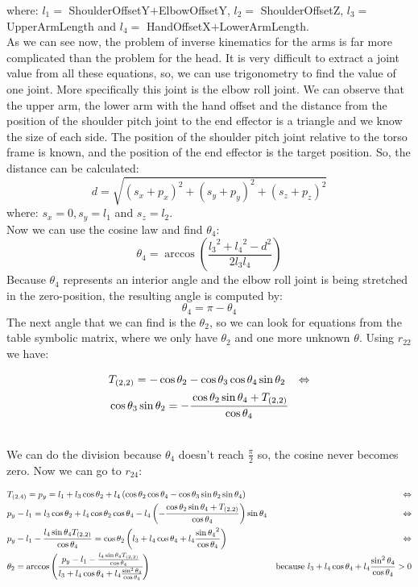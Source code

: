 where: $l_1 =$ ShoulderOffsetY$+$ElbowOffsetY, $l_2 =$ ShoulderOffsetZ, $l_3 =$ UpperArmLength and $l_4 =$ HandOffsetX$+$LowerArmLength.\\
As we can see now, the problem of inverse kinematics for the arms is far more complicated than the problem for the head. It is very difficult to extract a joint value from all these equations, so, we can use trigonometry to find the value of one joint. More specifically this joint is the elbow roll joint. We can observe that the upper arm, the lower arm with the hand offset and the distance from the position of the shoulder pitch joint to the end effector is a triangle and we know the size of each side. The position of the shoulder pitch joint relative to the torso frame is known, and the position of the end effector is the target position. So, the distance can be calculated:
\[
d=\sqrt{\left(s_x+p_x\right)^2 + \left(s_y+p_y\right)^2 + \left(s_z+p_z\right)^2}
\]
where: \(s_x = 0, s_y = l_1\) and \(s_z = l_2\).\\
Now we can use the cosine law and find \(\theta_4\):
\[
\theta_4 = \arccos\left(\frac{{l_3}^2 + {l_4}^2 - d^2}{2l_3l_4}\right)
\]
Because \(\theta_4\) represents an interior angle and the elbow roll joint is being stretched in the zero-position, the resulting angle is computed by:
\[
\theta_4 = \pi - \theta_4
\]
The next angle that we can find is the \(\theta_2\), so we can look for equations from the table symbolic matrix, where we only have \(\theta_2\) and one more unknown \(\theta\). Using $r_{22}$ we have:
\begin{small}
\begin{align*}
&T_{(2,2)} = -\cos\theta_2 - \cos\theta_3\cos\theta_4\sin\theta_2 &\Leftrightarrow\\
&\cos\theta_3\sin\theta_2 = -\cfrac{\cos\theta_2\sin\theta_4 + T_{(2,2)}}{\cos\theta_4}
\end{align*}
\end{small}\\
We can do the division because $\theta_4$ doesn't reach $\frac{\pi}{2} $ so, the cosine never becomes zero. Now we can go to $r_{24}$:
\begin{small}
\begin{align*}
&T_{(2,4)} = p_y = l_1 + l_3\cos\theta_2 + l_4\left(\cos\theta_2\cos\theta_4 - \cos\theta_3\sin\theta_2\sin\theta_4\right)&\Leftrightarrow\\
&p_y - l_1 =l_3\cos\theta_2 + l_4\cos\theta_2\cos\theta_4 - l_4\left(-\frac{\cos\theta_2\sin\theta_4 + T_{(2,2)}}{\cos\theta_4}\right)\sin\theta_4&\Leftrightarrow\\
&p_y - l_1 - \frac{l_4\sin\theta_4 T_{(2,2)}}{\cos\theta_4} = \cos\theta_2\left(l_3 + l_4\cos\theta_4 + l_4\frac{{\sin\theta_4}^2}{\cos\theta_4}\right)&\Leftrightarrow\\
&\theta_2 = \arccos\left(\cfrac{p_y - l_1 - \frac{l_4\sin\theta_4 T_{(2,2)}}{\cos\theta_4}}{l_3 + l_4\cos\theta_4 + l_4\frac{\sin^2\theta_4}{\cos\theta_4}}\right) & \text{because }   l_3 + l_4\cos\theta_4 + l_4\frac{\sin^2\theta_4}{\cos\theta_4}>0
\end{align*}
\end{small}\\
